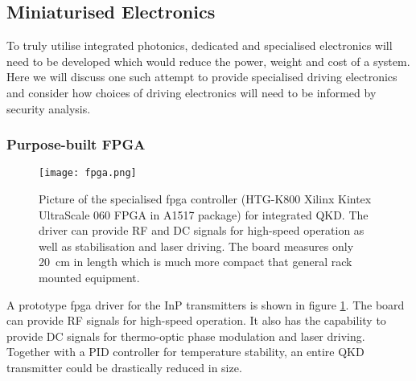 


\subsection{Miniaturised Electronics}

To truly utilise integrated photonics, dedicated and specialised electronics will need to be developed which would reduce the power, weight and cost of a system. Here we will discuss one such attempt to provide specialised driving electronics and consider how choices of driving electronics will need to be informed by security analysis.

\subsubsection{Purpose-built FPGA}

\begin{figure}[t]
	\centering
	\texttt{[image: fpga.png]}
	\caption[Picture of the specialised FPGA controller for integrated QKD]{Picture of the specialised \ac{fpga} controller (HTG-K800 Xilinx Kintex UltraScale 060 FPGA in A1517 package) for integrated QKD. The driver can provide RF and DC signals for high-speed operation as well as stabilisation and laser driving. The board measures only \SI{20}{\cm} in length which is much more compact that general rack mounted equipment.}
	\label{fig:fpga}
\end{figure}

A prototype \ac{fpga} driver for the \ac{InP} transmitters is shown in figure \ref{fig:fpga}. The board can provide RF signals for high-speed operation. It also has the capability to provide DC signals for thermo-optic phase modulation and laser driving. Together with a PID controller for temperature stability, an entire \ac{QKD} transmitter could be drastically reduced in size.

